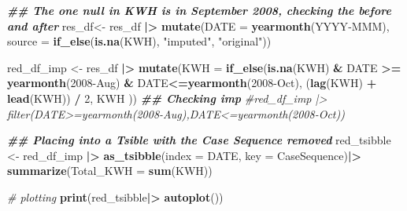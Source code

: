 \documentclass[
]{article}
\newenvironment{Shaded}{\begin{snugshade}}{\end{snugshade}}
\newcommand{\AttributeTok}[1]{\textcolor[rgb]{0.13,0.29,0.53}{#1}}
\newcommand{\CommentTok}[1]{\textcolor[rgb]{0.56,0.35,0.01}{\textit{#1}}}
\newcommand{\DecValTok}[1]{\textcolor[rgb]{0.00,0.00,0.81}{#1}}
\newcommand{\DocumentationTok}[1]{\textcolor[rgb]{0.56,0.35,0.01}{\textbf{\textit{#1}}}}
\newcommand{\FunctionTok}[1]{\textcolor[rgb]{0.13,0.29,0.53}{\textbf{#1}}}
\newcommand{\NormalTok}[1]{#1}
\newcommand{\OtherTok}[1]{\textcolor[rgb]{0.56,0.35,0.01}{#1}}
\newcommand{\SpecialCharTok}[1]{\textcolor[rgb]{0.81,0.36,0.00}{\textbf{#1}}}
\newcommand{\StringTok}[1]{\textcolor[rgb]{0.31,0.60,0.02}{#1}}
\begin{document}
\begin{Shaded}
\begin{Highlighting}[]
\DocumentationTok{\#\# The one null in KWH is in September 2008, checking the before and after}
\NormalTok{res\_df}\OtherTok{\textless{}{-}}\NormalTok{ res\_df }\SpecialCharTok{|\textgreater{}}
    \FunctionTok{mutate}\NormalTok{(}\AttributeTok{DATE =} \FunctionTok{yearmonth}\NormalTok{(}\StringTok{\textasciigrave{}}\AttributeTok{YYYY{-}MMM}\StringTok{\textasciigrave{}}\NormalTok{),}
           \AttributeTok{source =} \FunctionTok{if\_else}\NormalTok{(}\FunctionTok{is.na}\NormalTok{(KWH), }\StringTok{"imputed"}\NormalTok{, }\StringTok{"original"}\NormalTok{))}

\NormalTok{red\_df\_imp }\OtherTok{\textless{}{-}}\NormalTok{ res\_df }\SpecialCharTok{|\textgreater{}} \FunctionTok{mutate}\NormalTok{(}\AttributeTok{KWH =} \FunctionTok{if\_else}\NormalTok{(}\FunctionTok{is.na}\NormalTok{(KWH) }\SpecialCharTok{\&}\NormalTok{ DATE }\SpecialCharTok{\textgreater{}=} \FunctionTok{yearmonth}\NormalTok{(}\StringTok{\textquotesingle{}2008{-}Aug\textquotesingle{}}\NormalTok{) }\SpecialCharTok{\&}\NormalTok{ DATE}\SpecialCharTok{\textless{}=}\FunctionTok{yearmonth}\NormalTok{(}\StringTok{\textquotesingle{}2008{-}Oct\textquotesingle{}}\NormalTok{),}
\NormalTok{                                  (}\FunctionTok{lag}\NormalTok{(KWH) }\SpecialCharTok{+} \FunctionTok{lead}\NormalTok{(KWH)) }\SpecialCharTok{/} \DecValTok{2}\NormalTok{, KWH ))}
\DocumentationTok{\#\# Checking imp}
\CommentTok{\#red\_df\_imp |\textgreater{} filter(DATE\textgreater{}=yearmonth(\textquotesingle{}2008{-}Aug\textquotesingle{}),DATE\textless{}=yearmonth(\textquotesingle{}2008{-}Oct\textquotesingle{}))}

\DocumentationTok{\#\# Placing into a Tsible with the Case Sequence removed}
\NormalTok{red\_tsibble }\OtherTok{\textless{}{-}}\NormalTok{ red\_df\_imp }\SpecialCharTok{|\textgreater{}}
  \FunctionTok{as\_tsibble}\NormalTok{(}\AttributeTok{index =} \StringTok{\textquotesingle{}DATE\textquotesingle{}}\NormalTok{, }\AttributeTok{key =}\NormalTok{ CaseSequence)}\SpecialCharTok{|\textgreater{}}
  \FunctionTok{summarize}\NormalTok{(}\AttributeTok{Total\_KWH =} \FunctionTok{sum}\NormalTok{(KWH))}

\CommentTok{\# plotting}
\FunctionTok{print}\NormalTok{(red\_tsibble}\SpecialCharTok{|\textgreater{}} \FunctionTok{autoplot}\NormalTok{())}
\end{Highlighting}
\end{Shaded}
\end{document}
